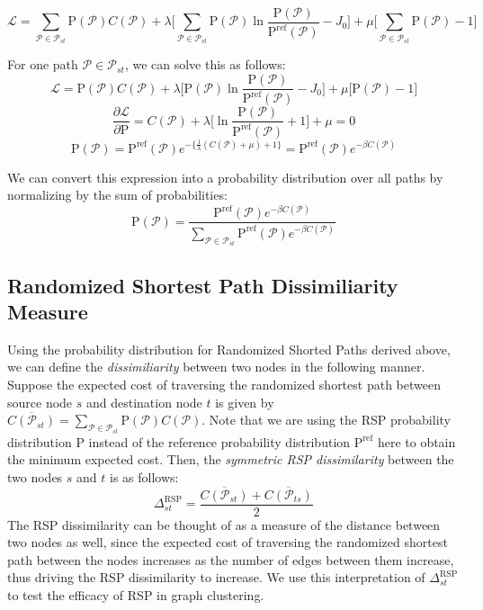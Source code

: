 \begin{equation}
\mathcal{L} = \sum\limits_{\mathcal{P} \in \mathcal{P}_{st}} \mathrm{P}(\mathcal{P})C(\mathcal{P})  + \lambda \Bigg\lbrack\sum\limits_{\mathcal{P} \in \mathcal{P}_{st}} \mathrm{P}(\mathcal{P}) \ln \frac{\mathrm{P}(\mathcal{P}) } { \mathrm{P^{ref}}(\mathcal{P})} - J_0 \Bigg\rbrack + \mu\Bigg\lbrack \sum\limits_{\mathcal{P} \in \mathcal{P}_{st}} \mathrm{P}(\mathcal{P}) - 1 \Bigg\rbrack
\end{equation}

For one path $\mathcal{P} \in \mathcal{P}_{st}$, we can solve this as follows:
\[
\mathcal{L} = \mathrm{P}(\mathcal{P})C(\mathcal{P})  + \lambda \Bigg\lbrack \mathrm{P}(\mathcal{P}) \ln \frac{\mathrm{P}(\mathcal{P}) } { \mathrm{P^{ref}}(\mathcal{P})} - J_0 \Bigg\rbrack + \mu\Bigg\lbrack \mathrm{P}(\mathcal{P}) - 1 \Bigg\rbrack
\]
\[
\frac{\partial \mathcal{L}}{\partial \mathrm{P}} = C(\mathcal{P}) + \lambda \Bigg\lbrack  \ln \frac{\mathrm{P}(\mathcal{P}) }{ \mathrm{P^{ref}}(\mathcal{P})} + 1\Bigg\rbrack  + \mu= 0
\]
\[
\mathrm{P}(\mathcal{P}) = \mathrm{P^{ref}}(\mathcal{P}) e^{-\{\frac{1}{\lambda} (C(\mathcal{P}) + \mu) +1 \}} = \mathrm{P^{ref}}(\mathcal{P}) e^{-\beta C(\mathcal{P})}
\]

We can convert this expression into a probability distribution over all paths by normalizing by the sum of probabilities:
\begin{equation}
\mathrm{P}(\mathcal{P}) = \frac{\mathrm{P^{ref}}(\mathcal{P}) e^{-\beta C(\mathcal{P})}}{\sum\limits_{\mathcal{P} \in \mathcal{P}_{st}}\mathrm{P^{ref}}(\mathcal{P}) e^{-\beta C(\mathcal{P})}} 
\end{equation}

\subsection{Randomized Shortest Path Dissimiliarity Measure}

Using the probability distribution for Randomized Shorted Paths derived above, we can define the \emph{dissimiliarity} between two nodes in the following manner. Suppose the expected cost of traversing the randomized shortest path between source node $s$ and destination node $t$ is given by $\overline{C(\mathcal{P}_{st})} = \sum\limits_{\mathcal{P} \in \mathcal{P}_{st}} \mathrm{P}(\mathcal{P})C(\mathcal{P})$. Note that we are using the RSP probability distribution $\mathrm{P}$ instead of the reference probability distribution $\mathrm{P^{ref}}$ here to obtain the minimum expected cost. Then, the \emph{symmetric RSP dissimilarity} between the two nodes $s$ and $t$ is as follows:
\[
\Delta^{\mathrm{RSP}}_{st} =\frac{\overline{C(\mathcal{P}_{st})} + \overline{C(\mathcal{P}_{ts})}}{2}
\]
The RSP dissimilarity can be thought of as a measure of the distance between two nodes as well, since the expected cost of traversing the randomized shortest path between the nodes increases as the number of edges between them increase, thus driving the RSP dissimilarity to increase. We use this interpretation of $\Delta^{\mathrm{RSP}}_{st}$ to test the efficacy of RSP in graph clustering.

